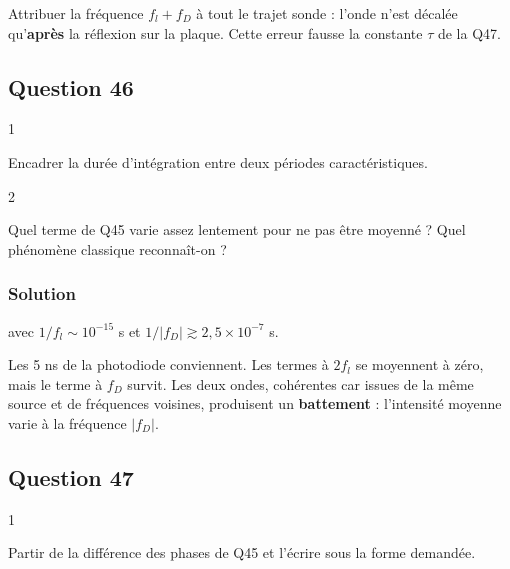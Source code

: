 \documentclass[11pt,a4paper]{article}
\newcommand{\equationajustee}[1]{%
  \sbox{\boiteequation}{$\displaystyle #1$}%
  \ifdim\wd\boiteequation>\linewidth
    \[\resizebox{\linewidth}{!}{\usebox{\boiteequation}}\]%
  \else
    \[#1\]%
  \fi}
\begin{document}
\begin{piege}

Attribuer la fréquence \(f_l+f_D\) à tout le trajet sonde : l'onde n'est décalée qu'\textbf{après} la réflexion sur la plaque. Cette erreur fausse la constante \(\tau\) de la Q47.

\end{piege}

\hypertarget{question-46}{%
\subsection{Question 46}\label{question-46}}

\begin{indication}{1}

Encadrer la durée d'intégration entre deux périodes caractéristiques.

\end{indication}

\begin{indication}{2}

Quel terme de Q45 varie assez lentement pour ne pas être moyenné ? Quel phénomène classique reconnaît-on ?

\end{indication}

\hypertarget{solution-45}{%
\subsubsection{Solution}\label{solution-45}}

\equationajustee{\frac1{f_l}\ \ll\ \tau_{\text{int}}\ \ll\ \frac1{|f_D|}}

avec \(1/f_l\sim10^{-15}\) s et \(1/|f_D|\gtrsim2{,}5\times10^{-7}\) s.

Les 5 ns de la photodiode conviennent. Les termes à \(2f_l\) se moyennent à zéro, mais le terme à \(f_D\) survit. Les deux ondes, cohérentes car issues de la même source et de fréquences voisines, produisent un \textbf{battement} : l'intensité moyenne varie à la fréquence \(|f_D|\).

\hypertarget{question-47}{%
\subsection{Question 47}\label{question-47}}

\begin{indication}{1}

Partir de la différence des phases de Q45 et l'écrire sous la forme demandée.

\end{indication}
\end{document}
